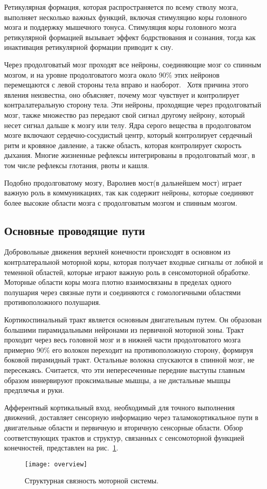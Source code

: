 Ретикулярная формация, которая распространяется по всему стволу мозга, выполняет несколько важных функций, включая стимуляцию коры головного мозга и поддержку мышечного тонуса. 
Стимуляция коры головного мозга ретикулярной формацией вызывает эффект бодрствования и сознания, тогда как инактивация ретикулярной формации приводит к сну.

Через продолговатый мозг проходят все нейроны, соединяющие мозг со спинным мозгом, и на уровне продолговатого мозга около 90\% этих нейронов перемещаются с левой стороны тела вправо и наоборот.~\cite{corticospinal}
Хотя причина этого явления неизвестна, оно объясняет, почему мозг чувствует и контролирует контралатеральную сторону тела. 
Эти нейроны, проходящие через продолговатый мозг, также множество раз передают свой сигнал другому нейрону, который несет сигнал дальше к мозгу или телу. 
Ядра серого вещества в продолговатом мозге включают сердечно-сосудистый центр, который контролирует сердечный ритм и кровяное давление, а также область, которая контролирует скорость дыхания. 
Многие жизненные рефлексы интегрированы в продолговатый мозг, в том числе рефлексы глотания, рвоты и кашля.

Подобно продолговатому мозгу, Варолиев мост(в дальнейшем мост) играет важную роль в коммуникациях, так как содержит нейроны, которые соединяют более высокие области мозга с продолговатым мозгом и спинным мозгом.

\subsection{Основные проводящие пути}
Добровольные движения верхней конечности происходят в основном из контрлатеральной моторной коры, которая получает входные сигналы от лобной и теменной областей, которые играют важную роль в сенсомоторной обработке. 
Моторные области коры мозга плотно взаимосвязаны в пределах одного полушария через связные пути и соединяются с гомологичными областями противоположного полушария.

Кортикоспинальный тракт является основным двигательным путем. 
Он образован большими пирамидальными нейронами из первичной моторной зоны. 
Тракт проходит через весь головной мозг и в нижней части продолговатого мозга примерно 90\% его волокон переходит на противоположную сторону, формируя боковой пирамидный тракт.
Остальные волокна спускаются в спинной мозг, не пересекаясь.
Считается, что эти непересеченные передние выступы главным образом иннервируют проксимальные мышцы, а не дистальные мышцы предплечья и руки.~\cite{cnsphysiology}

Афферентный кортикальный вход, необходимый для точного выполнения движений, доставляет сенсорную информацию через таламокортикальное пути в двигательные области и первичную и вторичную сенсорные области. 
Обзор соответствующих трактов и структур, связанных с сенсомоторной функцией конечностей, представлен на рис.~\ref{fig:connections}.
\begin{figure}
	\centering
	\texttt{[image: overview]}
	\caption{Структурная связность моторной системы. }
	\label{fig:connections}
\end{figure}